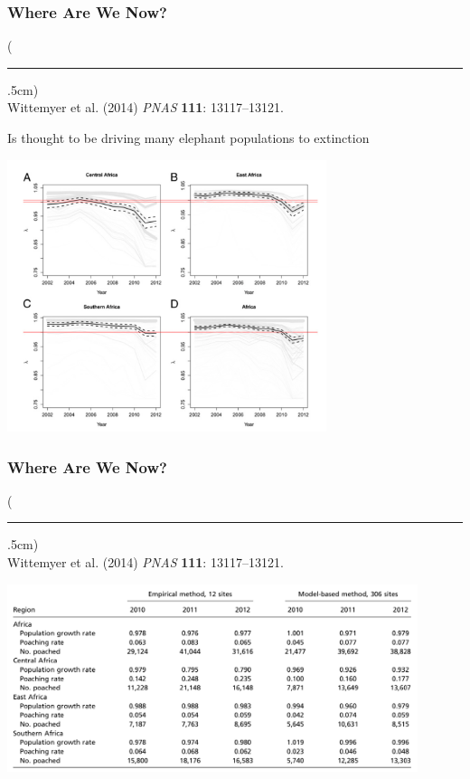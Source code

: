 \documentclass[10pt]{beamer}
\newenvironment{reference}[2]{%
	\begin{textblock*}{\textwidth}(#1,#2)
		\tiny\bgroup\color{gray}}{\egroup\end{textblock*}}
\begin{document}
\begin{frame}[t]
\frametitle{Where Are We Now?}
\vspace{0.5cm}

	\begin{reference}{4mm}{92mm}
		\rule{1.5cm}{0.25pt}\\
		Wittemyer et al. (2014) \emph{PNAS} \textbf{111}: 13117--13121.
	\end{reference}
	
	Is thought to be driving many elephant populations to extinction 
	
	\vspace{0.25cm}
	
	\begin{center}
		\includegraphics[width=0.70\textwidth]{figures/current_trends.png}
	\end{center}	
\end{frame}


\begin{frame}[t]
\frametitle{Where Are We Now?}
\vspace{0.5cm}

	\begin{reference}{4mm}{92mm}
		\rule{1.5cm}{0.25pt}\\
		Wittemyer et al. (2014) \emph{PNAS} \textbf{111}: 13117--13121.
	\end{reference}
	
	\begin{center}
		\includegraphics[width=0.90\textwidth]{figures/data_table.png}
	\end{center}	
\end{frame}
\end{document}
